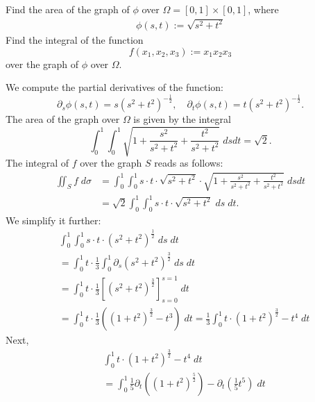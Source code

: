 \documentclass[11pt]{article}
\begin{document}
\begin{exercise}
    Find the area of the graph of $\phi$ over $\Omega = [0,1] \times [0,1]$, where 
    \begin{gather*}
        \phi(s,t) := \sqrt{ s^2 + t^2 }
    \end{gather*}
    Find the integral of the function 
    \[
        f(x_1,x_2,x_3) := x_1 x_2 x_3
    \]
    over the graph of $\phi$ over $\Omega$. 
\end{exercise}
\begin{solution}
    We compute the partial derivatives of the function:
    \[
        \partial_s \phi(s,t) = s ( s^2 + t^2 )^{- \frac 1 2},
        \quad 
        \partial_t \phi(s,t) = t ( s^2 + t^2 )^{- \frac 1 2}.
    \]
    The area of the graph over $\Omega$ is given by the integral 
    \[
        \int_0^1 \int_0^1 \sqrt{ 1 + \frac{ s^2 }{ s^2 + t^2 } + \frac{ t^2 }{ s^2 + t^2 } } \;dsdt = \sqrt{2}.
    \]
    The integral of $f$ over the graph $S$ reads as follows:
    \begin{align*}
        \iint_S f \;d\sigma
        &=
        \int_0^1 \int_0^1 s \cdot t \cdot \sqrt{ s^2 + t^2 } \cdot \sqrt{ 1 + \frac{ s^2 }{ s^2 + t^2 } + \frac{ t^2 }{ s^2 + t^2 } } \;dsdt
        \\&=
        \sqrt{2}
        \int_0^1 \int_0^1 s \cdot t \cdot \sqrt{ s^2 + t^2 } \;ds \;dt.
    \end{align*}
    We simplify it further:
    \begin{align*}
        &
        \int_0^1 \int_0^1 s \cdot t \cdot \left( s^2 + t^2 \right)^{\frac 1 2} \;ds \;dt
        \\&
        =
        \int_0^1 t \cdot \frac 1 3 \int_0^1 \partial_s ( s^2 + t^2 )^{\frac 3 2} \;ds \;dt
        \\&
        =
        \int_0^1 t \cdot \frac 1 3 \left[ ( s^2 + t^2 )^{\frac 3 2} \right]_{s=0}^{s=1} \;dt
        \\&
        =
        \int_0^1 t \cdot \frac 1 3 \left( ( 1 + t^2 )^{\frac 3 2} - t^{3} \right) \;dt
        =
        \frac 1 3 
        \int_0^1 t \cdot ( 1 + t^2 )^{\frac 3 2} - t^{4} \;dt
    \end{align*}
    Next, 
    \begin{align*}
        &
        \int_0^1 t \cdot ( 1 + t^2 )^{\frac 3 2} - t^{4} \;dt
        \\&
        =
        \int_0^1 
        \frac 1 5 \partial_t \left( \left( 1 + t^2 \right)^{\frac 5 2} \right) - \partial_t \left( \frac 1 5 t^{5} \right) 
        \;dt
        \\&

\end{align*}
\end{solution}
\end{document}
